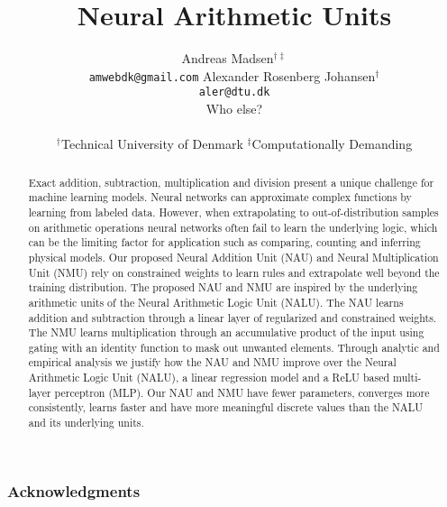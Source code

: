 \documentclass{article}
\title{Neural Arithmetic Units}
\author{%
  Andreas Madsen$^{\dag\ddag}$ \\
  \texttt{amwebdk@gmail.com}
  \AND
  Alexander Rosenberg Johansen$^{\dag}$ \\
  \texttt{aler@dtu.dk} \\
  \AND
  Who else? \\
  \\
$^\dag$Technical University of Denmark \quad
$^\ddag$Computationally Demanding
}
\begin{document}
\StopCensoring %

\maketitle

\begin{abstract}
Exact addition, subtraction, multiplication and division present a unique challenge for machine learning models.
Neural networks can approximate complex functions by learning from labeled data.
However, when extrapolating to out-of-distribution samples on arithmetic operations neural networks often fail to learn the underlying logic, which can be the limiting factor for application such as comparing, counting and inferring physical models.
Our proposed Neural Addition Unit (NAU) and Neural Multiplication Unit (NMU) rely on constrained weights to learn rules and extrapolate well beyond the training distribution.
The proposed NAU and NMU are inspired by the underlying arithmetic units of the Neural Arithmetic Logic Unit (NALU).
The NAU learns addition and subtraction through a linear layer of regularized and constrained weights.
The NMU learns multiplication through an accumulative product of the input using gating with an identity function to mask out unwanted elements.
Through analytic and empirical analysis we justify how the NAU and NMU improve over the Neural Arithmetic Logic Unit (NALU), a linear regression model and a ReLU based multi-layer perceptron (MLP).
Our NAU and NMU have fewer parameters, converges more consistently, learns faster and have more meaningful discrete values than the NALU and its underlying units.
\end{abstract}







\subsubsection*{Acknowledgments}





\newpage
\appendix



\end{document}
